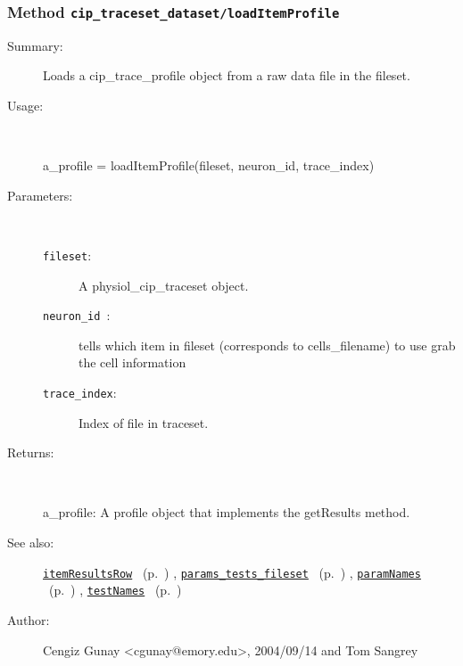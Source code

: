 \subsubsection[Method \texttt{loadItemProfile}]{Method \texttt{cip\_traceset\_dataset/loadItemProfile}}%
%
\label{ref_cip_traceset_dataset__loadItemProfile}%
\hypertarget{ref_cip_traceset_dataset__loadItemProfile}{}%
\begin{description}
\item[Summary:]Loads a cip\_trace\_profile object from a raw data file in the fileset.
%
\item[Usage:]~%
\begin{lyxcode}%
a\_profile = loadItemProfile(fileset, neuron\_id, trace\_index)
%
\end{lyxcode}%
%
%
\item[Parameters:]~
\begin{description}%
\item[\texttt{fileset}:]
     A physiol\_cip\_traceset object.
\item[\texttt{neuron\_id }:]
  tells which item in fileset (corresponds to cells\_filename) to use grab the cell information 
\item[\texttt{trace\_index}:]
 Index of file in traceset.
\end{description}%
%
\item[Returns:
]~

	a\_profile: A profile object that implements the getResults method.
%
%
\item[See also:]%
\hyperlink{ref_itemResultsRow}{\texttt{itemResultsRow}}%
\ (p.~\pageref{ref_itemResultsRow})%
%
, \hyperlink{ref_params_tests_fileset}{\texttt{params\_tests\_fileset}}%
\ (p.~\pageref{ref_params_tests_fileset})%
%
, \hyperlink{ref_paramNames}{\texttt{paramNames}}%
\ (p.~\pageref{ref_paramNames})%
%
, \hyperlink{ref_testNames}{\texttt{testNames}}%
\ (p.~\pageref{ref_testNames})%
%
%
\item[Author:]%
Cengiz Gunay <cgunay@emory.edu>, 2004/09/14 and Tom Sangrey
%
\end{description}
\methodline%
